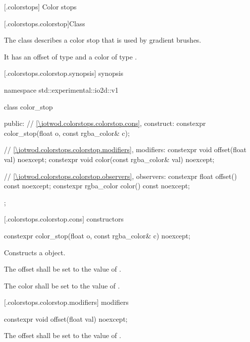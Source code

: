 [\iotwod.colorstops] {Color stops}

 [\iotwod.colorstops.colorstop]{Class }

\pnum
{}%
The class  describes a color stop that is used by gradient brushes.

\pnum
It has an offset of type  and a color of type .

 [\iotwod.colorstops.colorstop.synopsis] { synopsis}

\begin{codeblock}
namespace std::experimental::io2d::v1 {
  class color_stop {
  public:
  	// \ref{\iotwod.colorstops.colorstop.cons}, construct:
    constexpr color_stop(float o, const rgba_color& c);
    
    // \ref{\iotwod.colorstops.colorstop.modifiers}, modifiers:
    constexpr void offset(float val) noexcept;
	constexpr void color(const rgba_color& val) noexcept;
	
    // \ref{\iotwod.colorstops.colorstop.observers}, observers:
	constexpr float offset() const noexcept;
	constexpr rgba_color color() const noexcept;
  };
}
\end{codeblock}

 [\iotwod.colorstops.colorstop.cons]{ constructors}

%
\begin{itemdecl}
constexpr color_stop(float o, const rgba_color& c) noexcept;
\end{itemdecl}
\begin{itemdescr}
\pnum
\effects
Constructs a  object.

\pnum
The offset shall be set to the value of .

\pnum
The color shall be set to the value of .
\end{itemdescr}

 [\iotwod.colorstops.colorstop.modifiers]{ modifiers}

%
\begin{itemdecl}
constexpr void offset(float val) noexcept;
\end{itemdecl}
\begin{itemdescr}
	\pnum
	\effects
	The offset shall be set to the value of .
\end{itemdescr}

